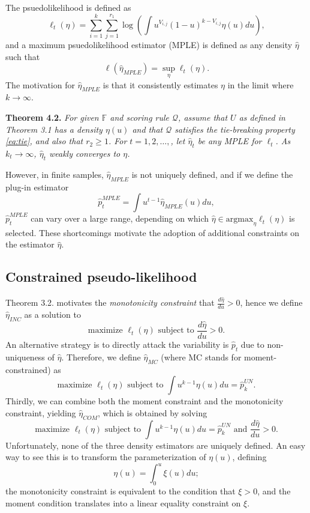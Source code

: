 \documentclass{article}
\newcommand{\argmax}{\text{argmax}}
\begin{document}
The psuedolikelihood is defined as
\begin{equation}\label{eq:psuedo}
\ell_t(\eta) = \sum_{i=1}^k \sum_{j=1}^{r_1} \log\left(\int u^{V_{i, j}} (1-u)^{k - V_{i, j}} \eta(u) du\right),
\end{equation}
and a maximum psuedolikelihood estimator (MPLE) is defined as any
density $\hat{\eta}$ such that
\[
\ell(\hat{\eta}_{MPLE}) = \sup_{\eta} \ell_t(\eta).
\]
The motivation for $\hat{\eta}_{MPLE}$ is that it consistently
estimates $\eta$ in the limit where $k \to \infty$.

\noindent\textbf{Theorem 4.2.}  \emph{ For given $\mathbb{F}$ and scoring
  rule $\mathcal{Q}$, assume that $U$ as defined in Theorem 3.1 has a
  density $\eta(u)$ and that $\mathcal{Q}$ satisfies the tie-breaking
  property \eqref{eq:tie}, and also that $r_2 \geq 1$.  For $t = 1, 2,
  \hdots, $, let $\hat{\eta}_t$ be any MPLE for $\ell_t$.  As $k_t \to
  \infty$, $\hat{\eta}_t$ weakly converges to $\eta$.}

However, in finite samples, $\hat{\eta}_{MPLE}$ is not uniquely defined,
and if we define the plug-in estimator
\[
\hat{p}_t^{MPLE} = \int u^{t-1} \hat{\eta}_{MPLE}(u) du,
\]
$\hat{p}_t^{MPLE}$ can vary over a large range, depending on which $\hat{\eta} \in \argmax_{\eta} \ell_t(\eta)$
is selected.
These shortcomings motivate the adoption of additional constraints on the estimator $\hat{\eta}.$

\subsection{Constrained pseudo-likelihood}

Theorem 3.2. motivates the \emph{monotonicity constraint} that $\frac{d\hat{\eta}}{du} > 0$,
hence we define $\hat{\eta}_{INC}$ as a solution to
\[
\text{maximize }\ell_t(\eta) \text{ subject to }\frac{d\hat{\eta}}{du} > 0.
\]
An alternative strategy is to directly attack the variability is $\hat{p}_t$ due to non-uniqueness of $\hat{\eta}$.
Therefore, we define $\hat{\eta}_{MC}$ (where MC stands for moment-constrained)
as
\[
\text{maximize }\ell_t(\eta) \text{ subject to }\int u^{k-1} \eta(u) du = \hat{p}_k^{UN}.
\]
Thirdly, we can combine both the moment constraint and the monotonicity constraint, yielding
$\hat{\eta}_{COM}$, which is obtained by solving
\[
\text{maximize }\ell_t(\eta) \text{ subject to }\int u^{k-1} \eta(u) du = \hat{p}_k^{UN}\text{ and }\frac{d\hat{\eta}}{du} > 0.
\]
Unfortunately, none of the three density estimators are uniquely defined.
An easy way to see this is to transform the parameterization of $\eta(u)$,
defining
\[
\eta(u) = \int_0^u \xi(u) du;
\]
the monotonicity constraint is equivalent to the condition that $\xi > 0$,
and the moment condition translates into a linear equality constraint on $\xi$.
\end{document}
